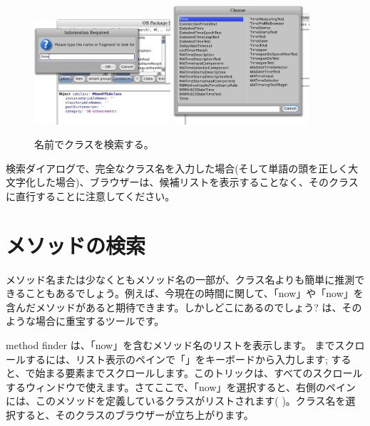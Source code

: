 \documentclass[a4paper,10pt,twoside]{book}
\begin{document}
\begin{figure}[hbt]
\centerline{
	\includegraphics[width=0.45\textwidth]{FindIt}
	\hspace{1cm}
	\includegraphics[width=0.45\textwidth]{TimeClasses}
}
\caption{名前でクラスを検索する。
}
\end{figure}

検索ダイアログで、完全なクラス名を入力した場合(そして単語の頭を正しく大文字化した場合)、ブラウザーは、候補リストを表示することなく、そのクラスに直行することに注意してください。

\section{メソッドの検索}

メソッド名または少なくともメソッド名の一部が、クラス名よりも簡単に推測できることもあるでしょう。例えば、今現在の時間に関して、「now」や「now」を含んだメソッドがあると期待できます。しかしどこにあるのでしょう?
は、そのような場合に重宝するツールです。

method finder は、「now」を含むメソッド名のリストを表示します。
までスクロールするには、リスト表示のペインで「」をキーボードから入力します; すると、で始まる要素までスクロールします。このトリックは、すべてのスクロールするウィンドウで使えます。さてここで、「now」を選択すると、右側のペインには、このメソッドを定義しているクラスがリストされます( )。クラス名を選択すると、そのクラスのブラウザーが立ち上がります。
\end{document}
